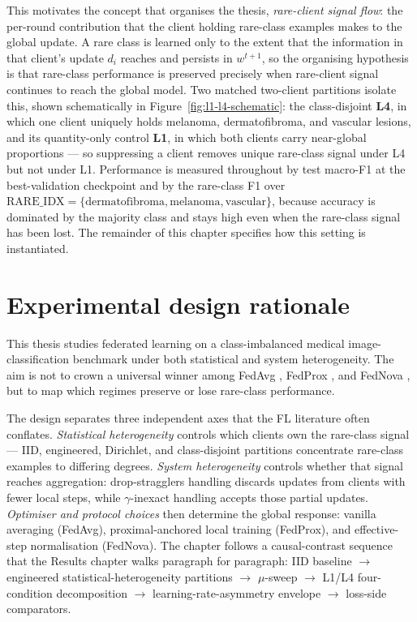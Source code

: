 \documentclass[11pt,a4paper]{report}
\begin{document}
This motivates the concept that organises the thesis, \emph{rare-client signal
flow}: the per-round contribution that the client holding rare-class examples
makes to the global update. A rare class is learned only to the extent that the
information in that client's update $d_i$ reaches and persists in $w^{t+1}$, so
the organising hypothesis is that rare-class performance is preserved precisely
when rare-client signal continues to reach the global model. Two matched
two-client partitions isolate this, shown schematically in
Figure~\ref{fig:l1-l4-schematic}: the class-disjoint \textbf{L4}, in which one
client uniquely holds melanoma, dermatofibroma, and vascular lesions, and its
quantity-only control \textbf{L1}, in which both clients carry near-global
proportions --- so suppressing a client removes unique rare-class signal under L4
but not under L1. Performance is measured throughout by test macro-F1 at the
best-validation checkpoint and by the rare-class F1 over
$\mathrm{RARE\_IDX} = \{\text{dermatofibroma}, \text{melanoma}, \text{vascular}\}$,
because accuracy is dominated by the majority class and stays high even when the
rare-class signal has been lost. The remainder of this chapter specifies how this
setting is instantiated.

\section{Experimental design rationale}
\label{sec:method-rationale}

This thesis studies federated learning on a class-imbalanced medical
image-classification benchmark under both statistical and system
heterogeneity. The aim is not to crown a universal winner among FedAvg
\citep{mcmahan2017fedavg}, FedProx \citep{li2020fedprox}, and FedNova
\citep{wang2020fednova}, but to map which regimes preserve or lose
rare-class performance.

The design separates three independent axes that the FL literature
often conflates. \emph{Statistical heterogeneity} controls which clients
own the rare-class signal --- IID, engineered, Dirichlet, and
class-disjoint partitions concentrate rare-class examples to differing
degrees. \emph{System heterogeneity} controls whether that signal
reaches aggregation: drop-stragglers handling discards updates from
clients with fewer local steps, while $\gamma$-inexact handling accepts
those partial updates. \emph{Optimiser and protocol choices} then
determine the global response: vanilla averaging (FedAvg),
proximal-anchored local training (FedProx), and effective-step
normalisation (FedNova). The chapter follows a causal-contrast
sequence that the Results chapter walks paragraph for paragraph:
IID baseline $\to$ engineered statistical-heterogeneity partitions
$\to$ $\mu$-sweep $\to$ L1/L4 four-condition decomposition $\to$
learning-rate-asymmetry envelope $\to$ loss-side comparators.
\end{document}

